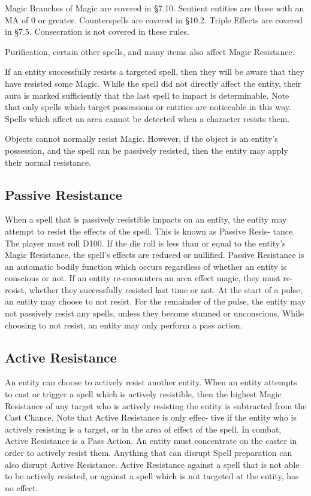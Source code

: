 \begin{Chapter}{Magic}
Branches of Magic are covered in §7.10.  Sentient entities are those
with an MA of 0 or greater.  Counterspells are covered in §10.2.
Triple Effects are covered in §7.5. Consecration is not covered in
these rules.

Purification, certain other spells, and many items also affect Magic
Resistance.

If an entity successfully resists a targeted spell, then they will be
aware that they have resisted some Magic. While the spell did not
directly affect the entity, their aura is marked sufficiently that the
last spell to impact is determinable. Note that only spells which
target possessions or entities are noticeable in this way.  Spells
which affect an area cannot be detected when a character resists them.

Objects cannot normally resist Magic.  However, if the object is an
entity’s possession, and the spell can be passively resisted, then the
entity may apply their normal resistance.

\subsection{Passive Resistance}

When a spell that is passively resistible impacts on an entity, the
entity may attempt to resist the effects of the spell.  This is known
as Passive Resis- tance. The player must roll D100. If the die roll is
less than or equal to the entity’s Magic Resistance, the spell’s
effects are reduced or nullified. Passive Resistance is an automatic
bodily function which occurs regardless of whether an entity is
conscious or not.  If an entity re-encounters an area effect magic,
they must re-resist, whether they successfully resisted last time or
not.  At the start of a pulse, an entity may choose to not resist.
For the remainder of the pulse, the entity may not passively resist
any spells, unless they become stunned or unconscious.  While choosing
to not resist, an entity may only perform a pass action.

\subsection{Active Resistance}

An entity can choose to actively resist another entity. When an entity
attempts to cast or trigger a spell which is actively resistible, then
the highest Magic Resistance of any target who is actively resisting
the entity is subtracted from the Cast Chance. Note that Active
Resistance is only effec- tive if the entity who is actively resisting
is a target, or in the area of effect of the spell. In combat, Active
Resistance is a Pass Action. An entity must concentrate on the caster
in order to actively resist them.  Anything that can disrupt Spell
preparation can also disrupt Active Resistance.  Active Resistance
against a spell that is not able to be actively resisted, or against a
spell which is not targeted at the entity, has no effect.



\end{Chapter}
